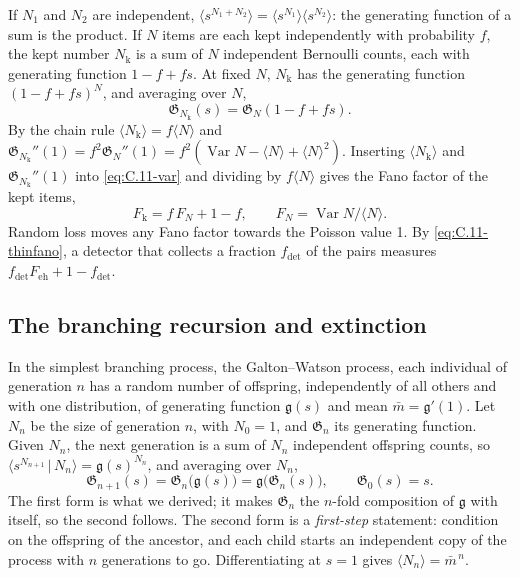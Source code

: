 If $N_1$ and $N_2$ are independent, $\langle s^{N_1 + N_2}\rangle = \langle s^{N_1}\rangle\langle s^{N_2}\rangle$: the generating function of a sum is the product. If $N$ items are each kept independently with probability $f$, the kept number $N_{\mathrm{k}}$ is a sum of $N$ independent Bernoulli counts, each with generating function $1 - f + fs$. At fixed $N$, $N_{\mathrm{k}}$ has the generating function $(1 - f + fs)^N$, and averaging over $N$,
\begin{equation}
  \mathfrak{G}_{N_{\mathrm{k}}}(s) = \mathfrak{G}_N(1 - f + fs) .
  \label{eq:C.11-thin}
\end{equation}
By the chain rule $\langle N_{\mathrm{k}}\rangle = f\langle N\rangle$ and $\mathfrak{G}_{N_{\mathrm{k}}}''(1) = f^2\mathfrak{G}_N''(1) = f^2(\operatorname{Var}N - \langle N\rangle + \langle N\rangle^2)$. Inserting $\langle N_{\mathrm{k}}\rangle$ and $\mathfrak{G}_{N_{\mathrm{k}}}''(1)$ into \cref{eq:C.11-var} and dividing by $f\langle N\rangle$ gives the Fano factor of the kept items,
\begin{equation}
  F_{\mathrm{k}} = f\,F_N + 1 - f, \qquad F_N = \operatorname{Var}N/\langle N\rangle .
  \label{eq:C.11-thinfano}
\end{equation}
Random loss moves any Fano factor towards the Poisson value 1. By \cref{eq:C.11-thinfano}, a detector that collects a fraction $f_{\mathrm{det}}$ of the pairs measures $f_{\mathrm{det}}F_{\mathrm{eh}} + 1 - f_{\mathrm{det}}$.

\subsection{The branching recursion and extinction}

In the simplest branching process, the Galton--Watson process, each individual of generation $n$ has a random number of offspring, independently of all others and with one distribution, of generating function $\mathfrak{g}(s)$ and mean $\bar m = \mathfrak{g}'(1)$. Let $N_n$ be the size of generation $n$, with $N_0 = 1$, and $\mathfrak{G}_n$ its generating function. Given $N_n$, the next generation is a sum of $N_n$ independent offspring counts, so $\langle s^{N_{n+1}}\,|\,N_n\rangle = \mathfrak{g}(s)^{N_n}$, and averaging over $N_n$,
\begin{equation}
  \mathfrak{G}_{n+1}(s) = \mathfrak{G}_n\bigl(\mathfrak{g}(s)\bigr) = \mathfrak{g}\bigl(\mathfrak{G}_n(s)\bigr), \qquad \mathfrak{G}_0(s) = s .
  \label{eq:C.11-gw}
\end{equation}
The first form is what we derived; it makes $\mathfrak{G}_n$ the $n$-fold composition of $\mathfrak{g}$ with itself, so the second follows. The second form is a \emph{first-step} statement: condition on the offspring of the ancestor, and each child starts an independent copy of the process with $n$ generations to go. Differentiating at $s = 1$ gives $\langle N_n\rangle = \bar m^{\,n}$.

